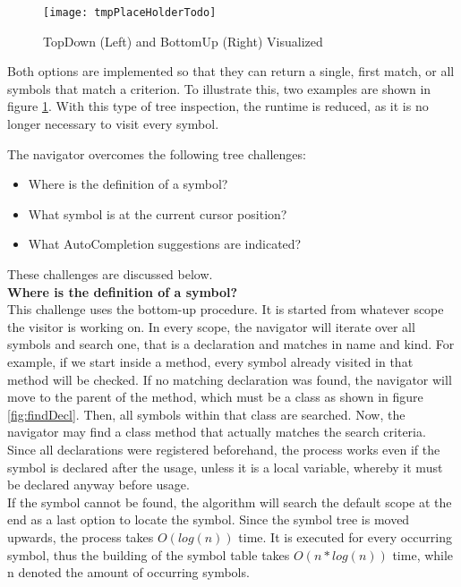 \begin{figure}[H]
    \centering
    \texttt{[image: tmpPlaceHolderTodo]}
    \caption{TopDown (Left) and BottomUp (Right) Visualized}
    \label{fig:impl_symboltablenav}
\end{figure}

Both options are implemented so that they can return a single, first match, or all symbols that match a criterion.
To illustrate this, two examples are shown in figure \ref{fig:impl_symboltablenav}.
With this type of tree inspection, the runtime is reduced, as it is no longer necessary to visit every symbol.

The navigator overcomes the following tree challenges:
\begin{itemize}
    \item Where is the definition of a symbol?
    \item What symbol is at the current cursor position?
    \item What AutoCompletion suggestions are indicated?
\end{itemize}
These challenges are discussed below. \\

\textbf{Where is the definition of a symbol?}\\
This challenge uses the bottom-up procedure.
It is started from whatever scope the visitor is working on.
In every scope, the navigator will iterate over all symbols and search one, that is a declaration and matches in name and kind.
For example, if we start inside a method, every symbol already visited in that method will be checked.
If no matching declaration was found, the navigator will move to the parent of the method, which must be a class
as shown in figure \ref{fig:findDecl}.
Then, all symbols within that class are searched.
Now, the navigator may find a class method that actually matches the search criteria.
Since all declarations were registered beforehand,
the process works even if the symbol is declared after the usage,
unless it is a local variable,
whereby it must be declared anyway before usage.\\

If the symbol cannot be found, the algorithm will search the default scope at the end as a last option to locate the symbol.
Since the symbol tree is moved upwards, the process takes $O(log(n))$ time.
It is executed for every occurring symbol, thus the building of the symbol table takes $O(n*log(n))$ time, while n denoted the amount of occurring symbols.\\

